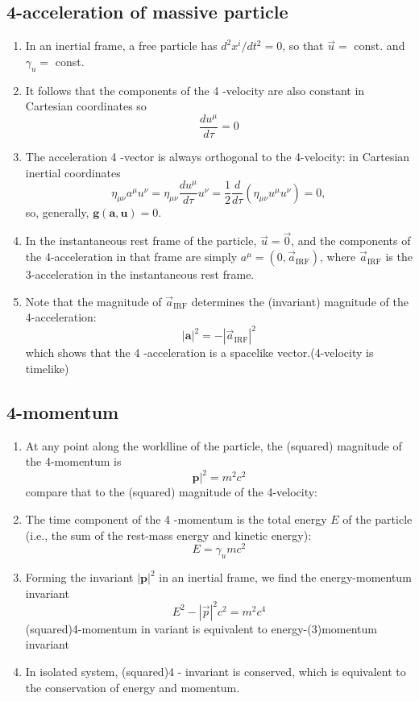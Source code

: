 \documentclass[12pt,a4paper]{article}
\begin{document}
\subsection{4-acceleration of massive particle}
\begin{enumerate}
    \item In an inertial frame, a free particle has $d^2 x^i / d t^2=0$, so that $\vec{u}=$ const. and $\gamma_u=$ const.
    \item It follows that the components of the 4 -velocity are also constant in Cartesian coordinates so
    $$
    \frac{d u^\mu}{d \tau}=0
    $$
    \item The acceleration 4 -vector is always orthogonal to the 4-velocity: in Cartesian inertial coordinates
    $$
    \eta_{\mu \nu} a^\mu u^\nu=\eta_{\mu \nu} \frac{d u^\mu}{d \tau} u^\nu=\frac{1}{2} \frac{d}{d \tau}\left(\eta_{\mu \nu} u^\mu u^\nu\right)=0,
    $$
    so, generally, $\boldsymbol{g}(\boldsymbol{a}, \boldsymbol{u})=0$.
    \item In the instantaneous rest frame of the particle, $\vec{u}=\overrightarrow{0}$, and the components of the 4-acceleration in that frame are simply $a^\mu=\left(0, \vec{a}_{\mathrm{IRF}}\right)$, where $\vec{a}_{\mathrm{IRF}}$ is the 3-acceleration in the instantaneous rest frame.
    \item Note that the magnitude of $\vec{a}_{\mathrm{IRF}}$ determines the (invariant) magnitude of the 4-acceleration:
    $$
    |\boldsymbol{a}|^2=-\left|\vec{a}_{\mathrm{IRF}}\right|^2
    $$
    which shows that the 4 -acceleration is a spacelike vector.(4-velocity is timelike)
\end{enumerate}
\subsection{4-momentum}
\begin{enumerate}
    \item At any point along the worldline of the particle, the (squared) magnitude of the 4-momentum is
    $$
        \boldsymbol{p}|^2=m^2 c^2
    $$
    compare that to the (squared) magnitude of the 4-velocity:
    \item The time component of the 4 -momentum is the total energy $E$ of the particle (i.e., the sum of the rest-mass energy and kinetic energy):
    $$
    E=\gamma_u m c^2
    $$
    \item Forming the invariant $|\boldsymbol{p}|^2$ in an inertial frame, we find the energy-momentum invariant
    $$
    E^2-|\vec{p}|^2 c^2=m^2 c^4
    $$ (squared)4-momentum in variant is equivalent to energy-(3)momentum invariant
    \item In isolated system, (squared)4 - invariant is conserved, which is equivalent to the conservation of energy and momentum. 
\end{enumerate}
\end{document}
